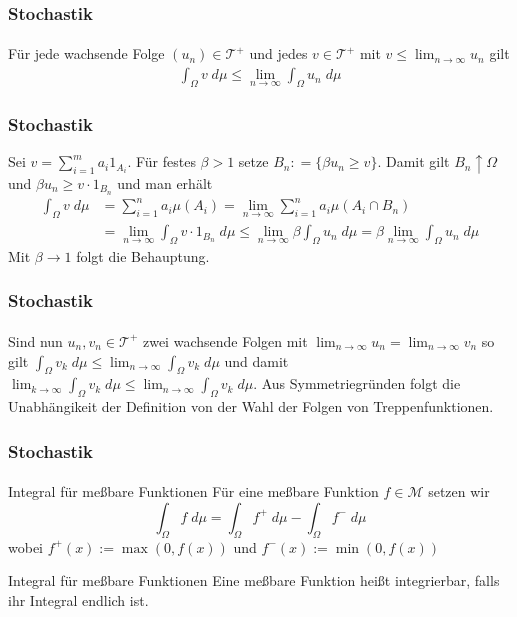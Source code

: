 \documentclass{beamer}
\begin{document}
\begin{frame}
    \frametitle{Stochastik}
\framesubtitle{}
    \begin{block}{}
        Für jede wachsende Folge $(u_n) \in \mathcal{T}^+$ und jedes $v \in \mathcal{T}^+$ mit $v \leq \lim_{n \to \infty} u_n$ gilt
        \begin{align*}
            \int_{\Omega} v \;  d \mu \leq \lim_{n \to \infty} \int_{\Omega} u_n \; d \mu  
        \end{align*}
    \end{block}

\end{frame}


\begin{frame}
    \frametitle{Stochastik}
    Sei $v = \sum_{i=1}^{m} a_i 1_{A_i}$.  
    Für festes $\beta > 1$ setze $B_n: = \{\beta u_n \geq v \}$.
    Damit gilt $B_n \uparrow \Omega$ und $\beta u_n \geq v \cdot 1_{B_n}$ und man erhält
    \begin{align*}
        \int_{\Omega} v \;  d \mu & = \sum_{i=1}^n a_i \mu (A_i) = \lim_{n \to \infty} \sum_{i=1}^n a_i \mu (A_i \cap B_n) \\
        & = \lim_{n \to \infty} \int_{\Omega} v \cdot 1_{B_n}\;  d \mu
        \leq \lim_{n \to \infty} \beta \int_{\Omega} u_n \;  d \mu = \beta \lim_{n \to \infty} \int_{\Omega} u_n \;  d \mu
    \end{align*}
    Mit $\beta \to 1$ folgt die Behauptung.
\framesubtitle{}
\end{frame}


\begin{frame}
    \frametitle{Stochastik}
\framesubtitle{}
         Sind nun $u_n, v_n \in \mathcal{T}^+$ zwei wachsende Folgen mit
          $\lim_{n \to \infty} u_n = \lim_{n \to \infty} v_n$ so gilt
          $\int_{\Omega} v_k \; d \mu \leq \lim_{n \to \infty} \int_{\Omega} v_k \; d \mu$ und damit 
          $\lim_{k \to \infty} \int_{\Omega} v_k \; d \mu  \leq \lim_{n \to \infty} \int_{\Omega} v_k \; d \mu$. 
          Aus Symmetriegründen folgt die Unabhängikeit der Definition von der Wahl der Folgen von Treppenfunktionen.
\end{frame}



\begin{frame}
    \frametitle{Stochastik}
\framesubtitle{}
    \begin{block}{Integral für meßbare Funktionen}
        Für eine meßbare Funktion  $f \in \mathcal{M}$ setzen wir
        $$ \int_{\Omega} f \; d\mu = \int_{\Omega}f^+ \; d\mu  - \int_{\Omega}f^- \; d\mu$$
        wobei $f^+(x) := \max (0, f(x))$ und $f^-(x) := \min (0, f(x))$
    \end{block}

    \begin{block}{Integral für meßbare Funktionen}
       Eine meßbare Funktion heißt integrierbar, falls ihr Integral endlich ist.
    \end{block}

\end{frame}
\end{document}
